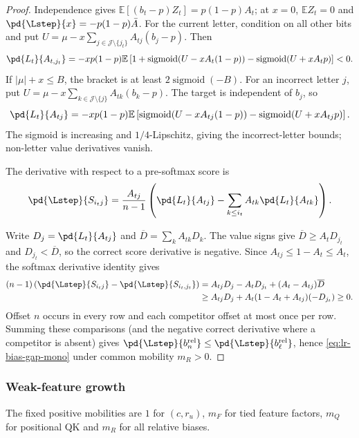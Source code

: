 \begin{proof}
Independence gives $\mathbb E[(b_t-p)Z_t]=p(1-p)A_t$;
at $x=0$, $\mathbb E Z_t=0$ and
$\pd{\Lstep}{x}=-p(1-p)\bar A$.
For the current letter, condition on all other bits and put
$U=\mu-x\sum_{j\in\mathcal J\setminus\{j_t\}}A_{tj}(b_j-p)$. Then
\[
 \pd{L_t}{A_{t,j_t}}=-xp(1-p)\mathbb E
 \left[1+\operatorname{sigmoid}(U-xA_t(1-p))-\operatorname{sigmoid}(U+xA_tp)\right]<0.
\]
If $|\mu|+x\le B$, the bracket is at least $2\operatorname{sigmoid}(-B)$.
For an incorrect letter $j$, put
$U=\mu-x\sum_{k\in\mathcal J\setminus\{j\}}A_{tk}(b_k-p)$.
The target is independent of $b_j$, so
\[
 \pd{L_t}{A_{tj}}=-xp(1-p)\mathbb E
 \left[\operatorname{sigmoid}(U-xA_{tj}(1-p))-\operatorname{sigmoid}(U+xA_{tj}p)\right].
\]
The sigmoid is increasing and $1/4$-Lipschitz, giving the incorrect-letter
bounds; non-letter value derivatives vanish.

The derivative with respect to a pre-softmax score is
\begin{equation}
 \pd{\Lstep}{S_{i_tj}}=\frac{A_{tj}}{n-1}
 \left(\pd{L_t}{A_{tj}}-\sum_{k\le i_t}A_{tk}\pd{L_t}{A_{tk}}\right).
\end{equation}

Write $D_j=\pd{L_t}{A_{tj}}$ and $\overline D=\sum_k A_{tk}D_k$.
The value signs give $\overline D\ge A_tD_{j_t}$ and $D_{j_t}<\overline D$,
so the correct score derivative is negative.
Since $A_{tj}\le1-A_t\le A_t$, the softmax derivative identity gives
\begin{align*}
 (n-1)\left(\pd{\Lstep}{S_{i_tj}}-\pd{\Lstep}{S_{i_t,j_t}}\right)
 &=A_{tj}D_j-A_tD_{j_t}+(A_t-A_{tj})\overline D\\
 &\ge A_{tj}D_j+A_t(1-A_t+A_{tj})(-D_{j_t})\ge0.
\end{align*}
Offset $n$ occurs in every row and each competitor offset at most once
per row. Summing these comparisons (and the negative correct derivative
where a competitor is absent) gives
$\pd{\Lstep}{b_n^{\mathrm{rel}}}\le\pd{\Lstep}{b_\ell^{\mathrm{rel}}}$,
hence \eqref{eq:lr-bias-gap-mono} under common mobility $m_R>0$.
\end{proof}

\subsubsection{Weak-feature growth}
\label{app:weak-routing-bootstrap}

The fixed positive mobilities are $1$ for $(c,r_u)$, $m_F$ for tied feature
factors, $m_Q$ for positional QK and $m_R$ for all relative biases.


